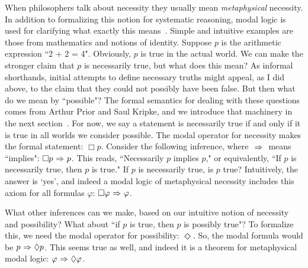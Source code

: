 When philosophers talk about necessity they usually mean \emph{metaphysical} necessity. In addition to formalizing this notion for systematic reasoning, modal logic is used for clarifying what exactly this means~\cite{Williamson}. Simple and intuitive examples are those from mathematics and notions of identity. Suppose $p$ is the arithmetic expression ``2 + 2 = 4". Obviously, $p$ is true in the actual world. We can make the stronger claim that $p$ is necessarily true, but what does this mean? As informal shorthands, initial attempts to define necessary truths might appeal, as I did above, to the claim that they could not possibly have been false. But then what do we mean by ``possible"? The formal semantics for dealing with these questions comes from Arthur Prior and Saul Kripke, and we introduce that machinery in the next section~\cite{Prior,Kripke}. For now, we say a statement is necessarily true if and only if it is true in all worlds we consider possible. The modal operator for necessity makes the formal statement: $\Box p$. Consider the following inference, where ${\ \Rightarrow \ }$ means ``implies": $\Box p {\ \Rightarrow \ } p$. This reads, ``Necessarily $p$ implies $p$," or equivalently, ``If $p$ is necessarily true, then $p$ is true." If $p$ is necessarily true, is $p$ true? Intuitively, the answer is `yes', and indeed a modal logic of metaphysical necessity includes this axiom for all formulas $\varphi$: $\Box \varphi {\ \Rightarrow \ } \varphi$. 

What other inferences can we make, based on our intuitive notion of necessity and possibility? What about ``if $p$ is true, then $p$ is possibly true"? To formalize this, we need the modal operator for possibility: $\Diamond$. So, the modal formula would be $p {\ \Rightarrow \ } \Diamond p$. This seems true as well, and indeed it is a theorem for metaphysical modal logic: $\varphi {\ \Rightarrow \ } \Diamond \varphi$. 

	
